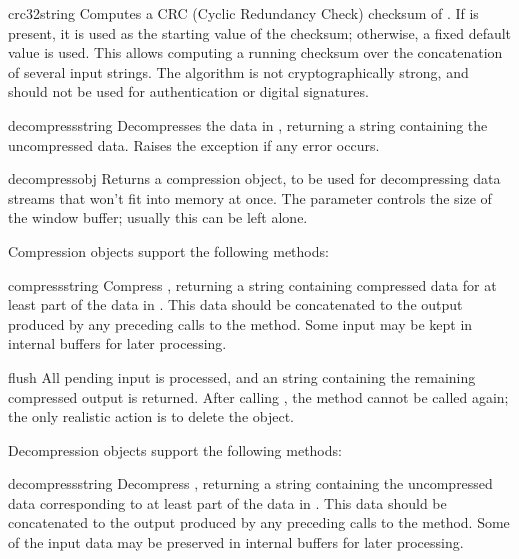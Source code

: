 \begin{funcdesc}{crc32}{string}
  Computes a CRC (Cyclic Redundancy Check)%
  checksum of . If
   is present, it is used as the starting value of the
  checksum; otherwise, a fixed default value is used.  This allows
  computing a running checksum over the concatenation of several
  input strings.  The algorithm is not cryptographically strong, and
  should not be used for authentication or digital signatures.
\end{funcdesc}

\begin{funcdesc}{decompress}{string}
Decompresses the data in , returning a string containing
the uncompressed data.  Raises the  exception if any
error occurs.
\end{funcdesc}

\begin{funcdesc}{decompressobj}{}
Returns a compression object, to be used for decompressing data streams
that won't fit into memory at once.  The  parameter
controls the size of the window buffer; usually this can be left
alone.
\end{funcdesc}

Compression objects support the following methods:

\begin{methoddesc}[Compress]{compress}{string}
Compress , returning a string containing compressed data
for at least part of the data in .  This data should be
concatenated to the output produced by any preceding calls to the
 method.  Some input may be kept in internal buffers
for later processing.
\end{methoddesc}

\begin{methoddesc}[Compress]{flush}{}
All pending input is processed, and an string containing the remaining
compressed output is returned.  After calling , the
 method cannot be called again; the only realistic
action is to delete the object.
\end{methoddesc}

Decompression objects support the following methods:

\begin{methoddesc}[Decompress]{decompress}{string}
Decompress , returning a string containing the
uncompressed data corresponding to at least part of the data in
.  This data should be concatenated to the output produced
by any preceding calls to the
 method.  Some of the input data may be preserved
in internal buffers for later processing.
\end{methoddesc}


